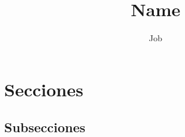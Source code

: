 \documentclass[12pt]{article}
\title{Name}
\author{Job}
\begin{document}
\maketitle

\section{Secciones}
\subsection{Subsecciones}
\end{document}
